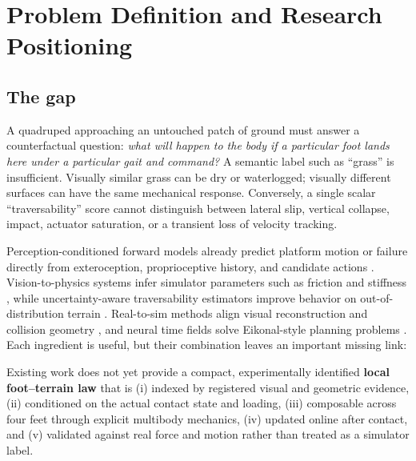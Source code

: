 \section{Problem Definition and Research Positioning}
\label{sec:problem}

\subsection{The gap}

A quadruped approaching an untouched patch of ground must answer a counterfactual question: \emph{what will happen to the body if a particular foot lands here under a particular gait and command?} A semantic label such as ``grass'' is insufficient. Visually similar grass can be dry or waterlogged; visually different surfaces can have the same mechanical response. Conversely, a single scalar ``traversability'' score cannot distinguish between lateral slip, vertical collapse, impact, actuator saturation, or a transient loss of velocity tracking.

Perception-conditioned forward models already predict platform motion or failure directly from exteroception, proprioceptive history, and candidate actions \citep{roth2025perceptive,kim2022forward}. Vision-to-physics systems infer simulator parameters such as friction and stiffness \citep{chen2024terrain}, while uncertainty-aware traversability estimators improve behavior on out-of-distribution terrain \citep{cai2024pietra,ren2024topnav,zhang2024traversability}. Real-to-sim methods align visual reconstruction and collision geometry \citep{chen2026quadverse,escontrela2025gaussgym,han2025re3sim}, and neural time fields solve Eikonal-style planning problems \citep{ni2023ntfields,liu2025active}. Each ingredient is useful, but their combination leaves an important missing link:

\begin{claimbox}
Existing work does not yet provide a compact, experimentally identified \textbf{local foot--terrain law} that is (i) indexed by registered visual and geometric evidence, (ii) conditioned on the actual contact state and loading, (iii) composable across four feet through explicit multibody mechanics, (iv) updated online after contact, and (v) validated against real force and motion rather than treated as a simulator label.
\end{claimbox}

